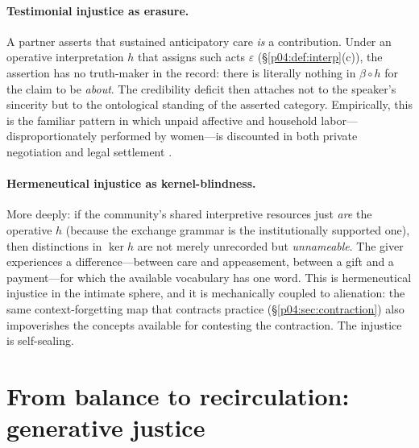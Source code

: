 \documentclass[11pt,a4paper]{article}
\begin{document}
\paragraph{Testimonial injustice as erasure.}
A partner asserts that sustained anticipatory care \emph{is} a contribution.
Under an operative interpretation $h$ that assigns such acts $\varepsilon$
(\S\ref{p04:def:interp}(c)), the assertion has no truth-maker in the record:
there is literally nothing in $\beta\circ h$ for the claim to be \emph{about}.
The credibility deficit then attaches not to the speaker's sincerity but to
the ontological standing of the asserted category. Empirically, this is the
familiar pattern in which unpaid affective and household labor---
disproportionately performed by women---is discounted in both private
negotiation and legal settlement \parencite{folbre2001}.

\paragraph{Hermeneutical injustice as kernel-blindness.}
More deeply: if the community's shared interpretive resources just \emph{are}
the operative $h$ (because the exchange grammar is the institutionally
supported one), then distinctions in $\ker h$ are not merely unrecorded but
\emph{unnameable}. The giver experiences a difference---between care and
appeasement, between a gift and a payment---for which the available
vocabulary has one word. This is hermeneutical injustice in the intimate
sphere, and it is mechanically coupled to alienation: the same
context-forgetting map that contracts practice (\S\ref{p04:sec:contraction}) also
impoverishes the concepts available for contesting the contraction. The
injustice is self-sealing.

\section{From balance to recirculation: generative justice}
\label{p04:sec:generative}
\end{document}
